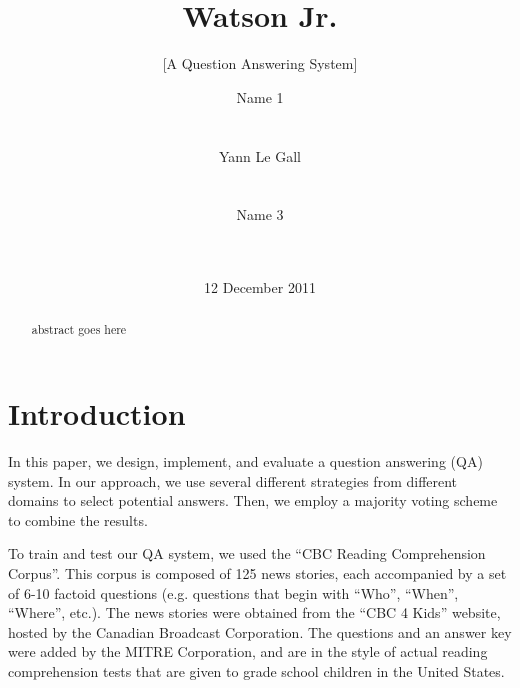 \documentclass{acm_proc_article-sp}
\begin{document}
\title{Watson Jr.}
\subtitle{[A Question Answering System]}

\author{
\alignauthor Name 1 \\
       \\
       \\
\alignauthor Yann Le Gall\\
       \\
       \\
\alignauthor Name 3 \\
       \\
       \\
}

\date{12 December 2011}
\maketitle


\begin{abstract}
abstract goes here
\end{abstract}



\section{Introduction}
\label{sec:intro}

In this paper, we design, implement, and evaluate a question answering
(QA) system. In our approach, we use several different strategies from
different domains to select potential answers. Then, we employ a
majority voting scheme to combine the results.

To train and test our QA system, we used the ``CBC Reading
Comprehension Corpus''. This corpus is composed of 125 news stories,
each accompanied by a set of 6-10 factoid questions (e.g. questions
that begin with ``Who'', ``When'', ``Where'', etc.).
The news stories were obtained from the ``CBC 4 Kids'' website,
hosted by the Canadian Broadcast Corporation. The questions and an
answer key were added by the MITRE Corporation, and are in the style
of actual reading comprehension tests that are given to grade school
children in the United States.
\end{document}
